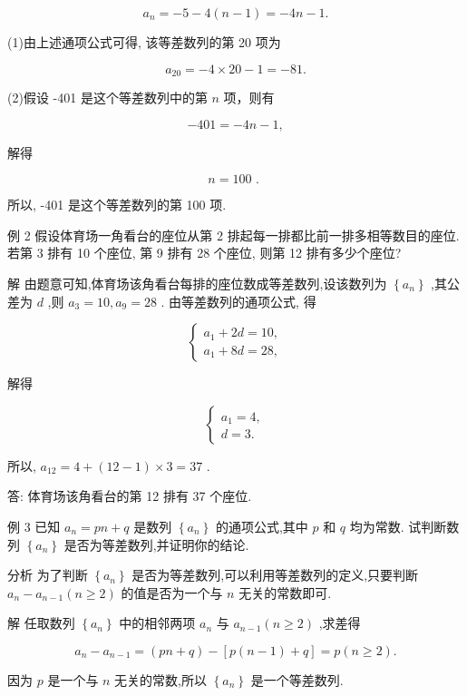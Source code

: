\documentclass[10pt]{article}
\begin{document}
\[
{a}_{n} =  - 5 - 4\left( {n - 1}\right)  =  - {4n} - 1.
\]

(1)由上述通项公式可得, 该等差数列的第 20 项为

\[
{a}_{20} =  - 4 \times  {20} - 1 =  - {81}.
\]

(2)假设 -401 是这个等差数列中的第 \(n\) 项，则有

\[
- {401} =  - {4n} - 1,
\]

解得

\[
n = {100}\text{ . }
\]

所以, -401 是这个等差数列的第 100 项.

例 2 假设体育场一角看台的座位从第 2 排起每一排都比前一排多相等数目的座位. 若第 3 排有 10 个座位, 第 9 排有 28 个座位, 则第 12 排有多少个座位?

解 由题意可知,体育场该角看台每排的座位数成等差数列,设该数列为 \(\left\{  {a}_{n}\right\}\) ,其公差为 \(d\) ,则 \({a}_{3} = {10},{a}_{9} = {28}\) . 由等差数列的通项公式, 得

\[
\left\{  \begin{array}{l} {a}_{1} + {2d} = {10}, \\  {a}_{1} + {8d} = {28}, \end{array}\right.
\]

解得

\[
\left\{  \begin{array}{l} {a}_{1} = 4, \\  d = 3. \end{array}\right.
\]

所以, \({a}_{12} = 4 + \left( {{12} - 1}\right)  \times  3 = {37}\) .

答: 体育场该角看台的第 12 排有 37 个座位.

例 3 已知 \({a}_{n} = {pn} + q\) 是数列 \(\left\{  {a}_{n}\right\}\) 的通项公式,其中 \(p\) 和 \(q\) 均为常数. 试判断数列 \(\left\{  {a}_{n}\right\}\) 是否为等差数列,并证明你的结论.

分析 为了判断 \(\left\{  {a}_{n}\right\}\) 是否为等差数列,可以利用等差数列的定义,只要判断 \({a}_{n} - {a}_{n - 1}\left( {n \geq  2}\right)\) 的值是否为一个与 \(n\) 无关的常数即可.

解 任取数列 \(\left\{  {a}_{n}\right\}\) 中的相邻两项 \({a}_{n}\) 与 \({a}_{n - 1}\left( {n \geq  2}\right)\) ,求差得

\[
{a}_{n} - {a}_{n - 1} = \left( {{pn} + q}\right)  - \left\lbrack  {p\left( {n - 1}\right)  + q}\right\rbrack   = p\left( {n \geq  2}\right) .
\]

因为 \(p\) 是一个与 \(n\) 无关的常数,所以 \(\left\{  {a}_{n}\right\}\) 是一个等差数列.
\end{document}
